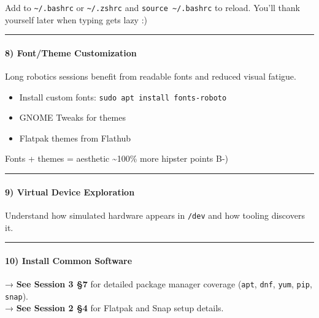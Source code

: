 \documentclass[
  english,
  paper=a4,
  oneside  ,captions=tableheading
]{scrartcl}
\providecommand{\tightlist}{%
  \setlength{\itemsep}{0pt}\setlength{\parskip}{0pt}}
\renewenvironment{quote}{\begin{customblockquote}\list{}{\rightmargin=0em\leftmargin=0em}%
\item\relax\color{blockquote-text}\ignorespaces}{\unskip\unskip\endlist\end{customblockquote}}
\begin{document}
Add to \texttt{\textasciitilde{}/.bashrc} or
\texttt{\textasciitilde{}/.zshrc} and
\texttt{source\ \textasciitilde{}/.bashrc} to reload. You'll thank
yourself later when typing gets lazy :)

\begin{center}\rule{0.5\linewidth}{0.5pt}\end{center}

\paragraph{8) Font/Theme Customization}\label{fonttheme-customization}

Long robotics sessions benefit from readable fonts and reduced visual
fatigue.

\begin{itemize}
\tightlist
\item
  Install custom fonts: \texttt{sudo\ apt\ install\ fonts-roboto}
\item
  GNOME Tweaks for themes
\item
  Flatpak themes from Flathub
\end{itemize}

Fonts + themes = aesthetic \textasciitilde100\% more hipster points B-)

\begin{center}\rule{0.5\linewidth}{0.5pt}\end{center}

\paragraph{9) Virtual Device
Exploration}\label{virtual-device-exploration}

Understand how simulated hardware appears in \texttt{/dev} and how
tooling discovers it.

\begin{center}\rule{0.5\linewidth}{0.5pt}\end{center}

\paragraph{10) Install Common Software}\label{install-common-software}

\begin{quote}
→ \textbf{See Session 3 §7} for detailed package manager coverage
(\texttt{apt}, \texttt{dnf}, \texttt{yum}, \texttt{pip},
\texttt{snap}).\\
→ \textbf{See Session 2 §4} for Flatpak and Snap setup details.
\end{quote}
\end{document}
